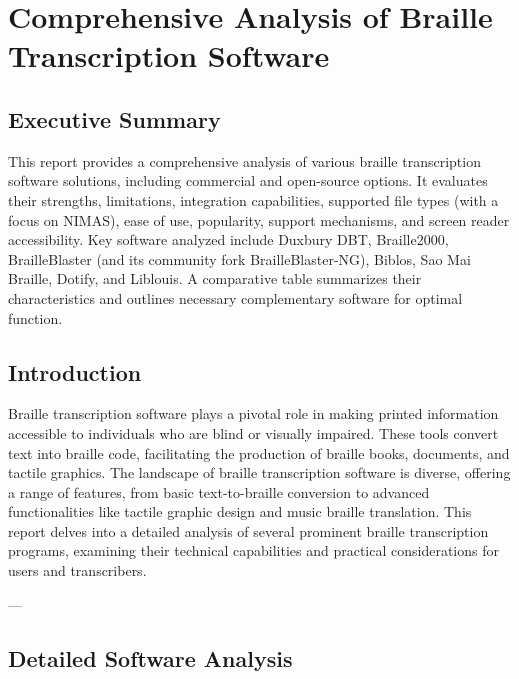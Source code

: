 \chapter{Comprehensive Analysis of Braille Transcription Software}
\label{chap:braille-transcription}
\author{Gemini AI}
\date{\today}
\maketitle

\section{Executive Summary}
\label{sec:braille-executive-summary}
This report provides a comprehensive analysis of various braille transcription software solutions, including commercial and open-source options. It evaluates their strengths, limitations, integration capabilities, supported file types (with a focus on NIMAS), ease of use, popularity, support mechanisms, and screen reader accessibility. Key software analyzed include Duxbury DBT, Braille2000, BrailleBlaster (and its community fork BrailleBlaster-NG), Biblos, Sao Mai Braille, Dotify, and Liblouis. A comparative table summarizes their characteristics and outlines necessary complementary software for optimal function.


\section{Introduction}
\label{sec:braille-intro}
Braille transcription software plays a pivotal role in making printed information accessible to individuals who are blind or visually impaired. These tools convert text into braille code, facilitating the production of braille books, documents, and tactile graphics. The landscape of braille transcription software is diverse, offering a range of features, from basic text-to-braille conversion to advanced functionalities like tactile graphic design and music braille translation. This report delves into a detailed analysis of several prominent braille transcription programs, examining their technical capabilities and practical considerations for users and transcribers.

---

\section{Detailed Software Analysis}
\label{sec:braille-detailed-analysis}

